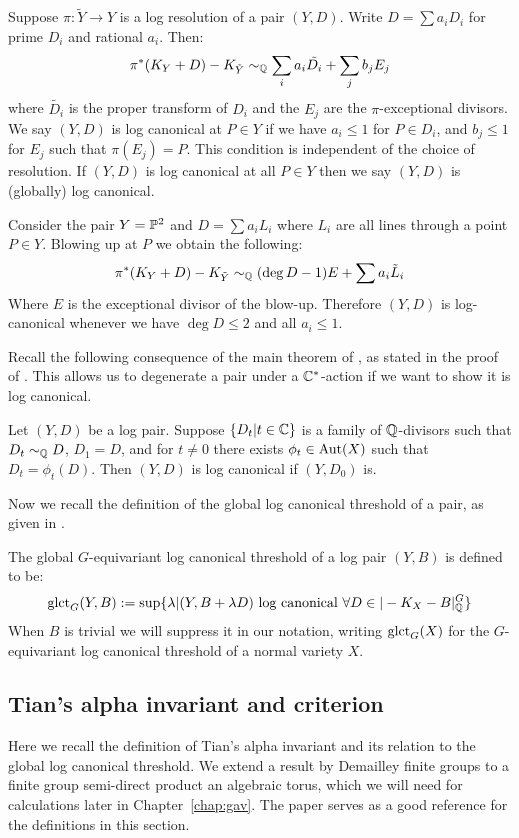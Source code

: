 \begin{definition}
Suppose \(\pi: \tilde{Y} \to Y\) is a log resolution of a pair \((Y,D)\). Write \(D = \sum a_i D_i\) for prime \(D_i\) and rational \(a_i\). Then:
\[
\pi^*(K_Y+ D) - K_{\tilde{Y}}\sim_{\mathbb{Q}} \sum_i a_i \tilde{D_i} + \sum_j b_j E_j
\]
where \(\tilde{D_i}\) is the proper transform of \(D_i\) and the \(E_j\) are the \(\pi\)-exceptional divisors. We say \((Y,D)\) is log canonical at \(P \in Y\) if we have \(a_i \le 1 \) for \(P \in D_i\), and \(b_j \le 1\) for \(E_j\) such that \(\pi(E_j) = P\). This condition is independent of the choice of resolution. If \((Y,D)\) is log canonical at all \(P  \in Y\) then we say \((Y,D)\) is (globally) log canonical.
\end{definition}
\begin{example} \label{examplelct}
Consider the pair \(Y = \mathbb{P}^2\) and \(D = \sum a_i L_i\) where \(L_i\) are all lines through a point \(P \in Y\). Blowing up at \(P\) we obtain the following:
\[
\pi^*(K_Y+D) - K_{\tilde{Y}} \sim_{\mathbb{Q}} (\deg D - 1) E + \sum a_i \tilde{L}_i
\]
Where \(E\) is the exceptional divisor  of the blow-up. Therefore \((Y,D)\) is log-canonical whenever we have \(\deg D \le 2\) and all \(a_i \le 1\).
\end{example}
Recall the following consequence of the main theorem of \cite{demailly2001}, as stated in the proof of \cite[Lemma 5.1]{cheltsov08}. This allows us to degenerate a pair under a \(\mathbb{C}^*\)-action if we want to show it is log canonical.
\begin{proposition} \label{degenpair}
Let \((Y,D)\) be a log pair. Suppose \(\{ D_t | t \in \mathbb{C}\}\) is a family of \(\mathbb{Q}\)-divisors such that \(D_t \sim_{\mathbb{Q}} D\), \(D_1 = D\), and for \(t \neq 0\) there exists \(\phi_t \in \mathop{\rm Aut}\nolimits(X)\) such that \(D_t = \phi_t(D)\). Then \((Y,D)\) is log canonical if \((Y,D_0)\) is.
\end{proposition}
Now we recall the definition of the global log canonical threshold of a pair, as given in \cite{suess18-2}.
\begin{definition}
The global \(G\)-equivariant log canonical threshold of a log pair \((Y,B)\)  is defined to be:
\[
\operatorname{glct}_{G}(Y,B) := \sup \{ \lambda | (Y,B+ \lambda D) \text{ log canonical } \forall D \in | -K_X - B |_{\mathbb{Q}}^G \}
\]
When \(B\) is trivial we will suppress it in our notation, writing \(\operatorname{glct}_G(X)\) for the \(G\)-equivariant log canonical threshold of a normal variety \(X\).
\end{definition}
\subsection{Tian's alpha invariant and criterion} \label{prelim:alphainvariant}
Here we recall the definition of Tian's alpha invariant and its relation to the global log canonical threshold. We extend a result by Demailley finite groups to a finite group semi-direct product an algebraic torus, which we will need for calculations later in Chapter~\ref{chap:gav}. The paper \cite{cheltsov08} serves as a good reference for the definitions in this section.


